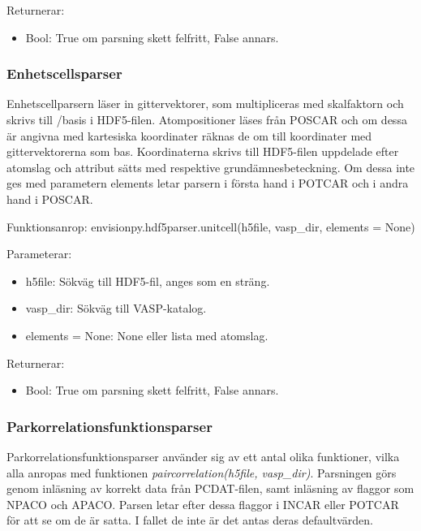 \documentclass[10pt,oneside,swedish]{article}
\providecommand{\tightlist}{%
  \setlength{\itemsep}{0pt}\setlength{\parskip}{0pt}}
\begin{document}
Returnerar:

\begin{itemize}
\tightlist
\item
  Bool: True om parsning skett felfritt, False annars.
\end{itemize}

\subsubsection{Enhetscellsparser}\label{enhetscellsparser}

Enhetscellparsern läser in gittervektorer, som multipliceras med
skalfaktorn och skrivs till /basis i HDF5-filen. Atompositioner läses
från POSCAR och om dessa är angivna med kartesiska koordinater räknas de
om till koordinater med gittervektorerna som bas. Koordinaterna skrivs
till HDF5-filen uppdelade efter atomslag och attribut sätts med
respektive grundämnesbeteckning. Om dessa inte ges med parametern
elements letar parsern i första hand i POTCAR och i andra hand i POSCAR.

Funktionsanrop: envisionpy.hdf5parser.unitcell(h5file, vasp\_dir,
elements = None)

Parameterar:

\begin{itemize}
\tightlist
\item
  h5file: Sökväg till HDF5-fil, anges som en sträng.
\item
  vasp\_dir: Sökväg till VASP-katalog.
\item
  elements = None: None eller lista med atomslag.
\end{itemize}

Returnerar:

\begin{itemize}
\tightlist
\item
  Bool: True om parsning skett felfritt, False annars.
\end{itemize}

\subsubsection{Parkorrelationsfunktionsparser}\label{parkorrelationsfunktionsparser}

Parkorrelationsfunktionsparser använder sig av ett antal olika
funktioner, vilka alla anropas med funktionen
\emph{paircorrelation(h5file, vasp\_dir)}. Parsningen görs genom
inläsning av korrekt data från PCDAT-filen, samt inläsning av flaggor
som NPACO och APACO. Parsen letar efter dessa flaggor i INCAR eller
POTCAR för att se om de är satta. I fallet de inte är det antas deras
defaultvärden.
\end{document}
